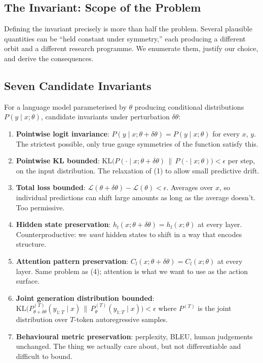 \documentclass[11pt, a4paper]{article}
\theoremstyle{plain}
\theoremstyle{definition}
\theoremstyle{remark}
\begin{document}
\subsection{The Invariant: Scope of the Problem}

Defining the invariant precisely is more than half the problem.
Several plausible quantities can be ``held constant under symmetry,'' each producing a different orbit and a different research programme.
We enumerate them, justify our choice, and derive the consequences.

\subsection{Seven Candidate Invariants}

For a language model parameterised by $\theta$ producing conditional distributions $P(y \mid x; \theta)$, candidate invariants under perturbation $\delta\theta$:

\begin{enumerate}[nosep]
\item \textbf{Pointwise logit invariance}: $P(y \mid x; \theta + \delta\theta) = P(y \mid x; \theta)$ for every $x$, $y$. The strictest possible, only true gauge symmetries of the function satisfy this.

\item \textbf{Pointwise KL bounded}: $\mathrm{KL}\!\big(P(\cdot \mid x; \theta + \delta\theta) \,\|\, P(\cdot \mid x; \theta)\big) < \epsilon$ per step, on the input distribution. The relaxation of (1) to allow small predictive drift.

\item \textbf{Total loss bounded}: $\mathcal{L}(\theta + \delta\theta) - \mathcal{L}(\theta) < \epsilon$. Averages over $x$, so individual predictions can shift large amounts as long as the average doesn't. Too permissive.

\item \textbf{Hidden state preservation}: $h_l(x; \theta+\delta\theta) = h_l(x;\theta)$ at every layer. Counterproductive: we \emph{want} hidden states to shift in a way that encodes structure.

\item \textbf{Attention pattern preservation}: $C_l(x; \theta+\delta\theta) = C_l(x;\theta)$ at every layer. Same problem as (4); attention is what we want to use as the action surface.

\item \textbf{Joint generation distribution bounded}: $\mathrm{KL}\!\big(P^{(T)}_{\theta+\delta\theta}(y_{1:T} \mid x) \,\|\, P^{(T)}_\theta(y_{1:T} \mid x)\big) < \epsilon$ where $P^{(T)}$ is the joint distribution over $T$-token autoregressive samples.

\item \textbf{Behavioural metric preservation}: perplexity, BLEU, human judgements unchanged. The thing we actually care about, but not differentiable and difficult to bound.
\end{enumerate}
\end{document}
